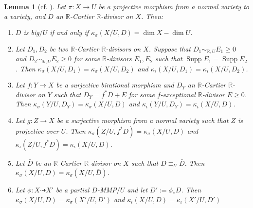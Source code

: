 \documentclass[11pt]{amsart}
\numberwithin{equation}{section}
\newcommand{\Rr}{\mathbb{R}}
\newcommand{\Supp}{\operatorname{Supp}}
\newtheorem{lem}[thm]{Lemma}
\theoremstyle{definition}
\theoremstyle{definition}
\theoremstyle{definition}
\begin{document}
\begin{lem}[{cf. \cite[Version 2, Lemma 2.10]{HL21}}]\label{lem: property of numerical and Iitaka dimension} Let $\pi: X\rightarrow U$ be a projective morphism from a normal variety to a variety, and $D$ an $\Rr$-Cartier $\Rr$-divisor on $X$. Then:
\begin{enumerate}
    \item $D$ is big$/U$ if and only if $\kappa_{\sigma}(X/U,D)=\dim X-\dim U$.
    \item Let $D_1,D_2$ be two $\Rr$-Cartier $\Rr$-divisors on $X$. Suppose that $D_1\sim_{\mathbb R,U}E_1\geq 0$ and $D_2\sim_{\mathbb R,U}E_2\geq 0$ for some $\Rr$-divisors $E_1,E_2$ such that $\Supp E_1=\Supp E_2$. Then $\kappa_{\sigma}(X/U,D_1)=\kappa_{\sigma}(X/U,D_2)$ and $\kappa_{\iota}(X/U,D_1)=\kappa_{\iota}(X/U,D_2)$.
    \item Let $f: Y\rightarrow X$ be a surjective birational morphism and $D_Y$ an $\Rr$-Cartier $\Rr$-divisor on $Y$ such that $D_Y=f^*D+E$ for some $f$-exceptional $\Rr$-divisor $E\geq 0$. Then $\kappa_{\sigma}(Y/U,D_Y)=\kappa_{\sigma}(X/U,D)$ and $\kappa_{\iota}(Y/U,D_Y)=\kappa_{\iota}(X/U,D)$. 
    \item Let $g: Z\rightarrow X$ be a surjective morphism from a normal variety such that $Z$ is projective over $U$. Then $\kappa_{\sigma}(Z/U,f^*D)=\kappa_{\sigma}(X/U,D)$ and $\kappa_{\iota}(Z/U,f^*D)=\kappa_{\iota}(X/U,D)$.
    \item  Let $\bar D$ be an $\Rr$-Cartier $\Rr$-divisor on $X$ such that $D\equiv_U\bar D$. Then $\kappa_{\sigma}(X/U,D)=\kappa_{\sigma}(X/U,\bar D)$.
    \item  Let $\phi: X\dashrightarrow X'$ be a partial $D$-MMP$/U$ and let $D':=\phi_*D$. Then $\kappa_{\sigma}(X/U,D)=\kappa_{\sigma}(X'/U,D')$ and $\kappa_{\iota}(X/U,D)=\kappa_{\iota}(X'/U,D')$
\end{enumerate}
\end{lem}
\end{document}
